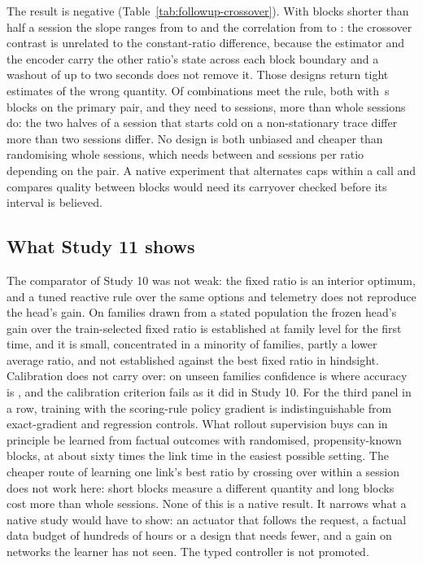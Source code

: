 \documentclass[10pt]{article}
\begin{document}
The result is negative (Table~\ref{tab:followup-crossover}). With blocks shorter than half a session the slope ranges from \TypedCrossShortSlopeLow{} to \TypedCrossShortSlopeHigh{} and the correlation from \TypedCrossShortCorrelationLow{} to \TypedCrossShortCorrelationHigh{}: the crossover contrast is unrelated to the constant-ratio difference, because the estimator and the encoder carry the other ratio's state across each block boundary and a washout of up to two seconds does not remove it. Those designs return tight estimates of the wrong quantity. Of \TypedCrossDesigns{} combinations \TypedCrossUsable{} meet the rule, both with \TypedCrossUsableBlock{}\,s blocks on the primary pair, and they need \TypedCrossUsableLow{} to \TypedCrossUsableHigh{} sessions, more than whole sessions do: the two halves of a session that starts cold on a non-stationary trace differ more than two sessions differ. No design is both unbiased and cheaper than randomising whole sessions, which needs between \TypedCrossWholeLow{} and \TypedCrossWholeHigh{} sessions per ratio depending on the pair. A native experiment that alternates caps within a call and compares quality between blocks would need its carryover checked before its interval is believed.

\subsection{What Study 11 shows}
The comparator of Study 10 was not weak: the fixed ratio is an interior optimum, and a tuned reactive rule over the same options and telemetry does not reproduce the head's gain. On families drawn from a stated population the frozen head's gain over the train-selected fixed ratio is established at family level for the first time, and it is small, concentrated in a minority of families, partly a lower average ratio, and not established against the best fixed ratio in hindsight. Calibration does not carry over: on unseen families confidence is \TypedRepConfidence{} where accuracy is \TypedRepAccuracy{}, and the calibration criterion fails as it did in Study 10. For the third panel in a row, training with the scoring-rule policy gradient is indistinguishable from exact-gradient and regression controls. What rollout supervision buys can in principle be learned from factual outcomes with randomised, propensity-known blocks, at about sixty times the link time in the easiest possible setting. The cheaper route of learning one link's best ratio by crossing over within a session does not work here: short blocks measure a different quantity and long blocks cost more than whole sessions. None of this is a native result. It narrows what a native study would have to show: an actuator that follows the request, a factual data budget of hundreds of hours or a design that needs fewer, and a gain on networks the learner has not seen. The typed controller is not promoted.
\end{document}

